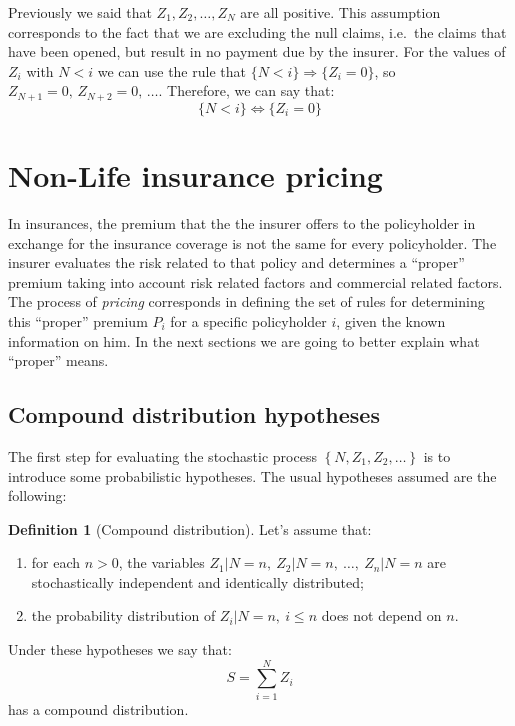 \documentclass[a4paper, twoside, openright, 12pt]{report}
\providecommand{\tightlist}{%
  \setlength{\itemsep}{0pt}\setlength{\parskip}{0pt}}
\theoremstyle{definition}
\newtheorem{definition}{Definition}[chapter]
\theoremstyle{definition}
\theoremstyle{definition}
\theoremstyle{remark}
\begin{document}
Previously we said that \(Z_1, Z_2, \dots, Z_N\) are all positive. This assumption corresponds to the fact that we are excluding the null claims, i.e.~the claims that have been opened, but result in no payment due by the insurer. For the values of \(Z_i\) with \(N<i\) we can use the rule that \(\{N<i\} \Rightarrow \{Z_i = 0\}\), so \(Z_{N+1}=0, \, Z_{N+2}=0, \, \dots\). Therefore, we can say that:
\[
\{N<i \} \Longleftrightarrow \{Z_i = 0\}
\]

\hypertarget{chap:nlip-details}{%
\section{Non-Life insurance pricing}\label{chap:nlip-details}}

In insurances, the premium that the the insurer offers to the policyholder in exchange for the insurance coverage is not the same for every policyholder. The insurer evaluates the risk related to that policy and determines a ``proper'' premium taking into account risk related factors and commercial related factors. The process of \emph{pricing} corresponds in defining the set of rules for determining this ``proper'' premium \(P_i\) for a specific policyholder \(i\), given the known information on him. In the next sections we are going to better explain what ``proper'' means.

\hypertarget{compound-distribution-hypotheses}{%
\subsection{Compound distribution hypotheses}\label{compound-distribution-hypotheses}}

The first step for evaluating the stochastic process \(\left\{N, Z_1, Z_2, \dots \right\}\) is to introduce some probabilistic hypotheses. The usual hypotheses assumed are the following:

\begin{definition}[Compound distribution]
\label{def:comp-dist} \iffalse (Compound distribution) \fi{}
Let's assume that:

\begin{enumerate}
\def\labelenumi{\arabic{enumi}.}
\tightlist
\item
  for each \(n>0\), the variables \(Z_1|N=n,\ Z_2|N=n,\ \dots,\ Z_n|N=n\) are stochastically independent and identically distributed;
\item
  the probability distribution of \(Z_i|N=n, \ i\le n\) does not depend on \(n\).
\end{enumerate}

Under these hypotheses we say that:
\[
S = \sum_{i=1}^{N}{Z_i}
\]
has a compound distribution.
\end{definition}
\end{document}
